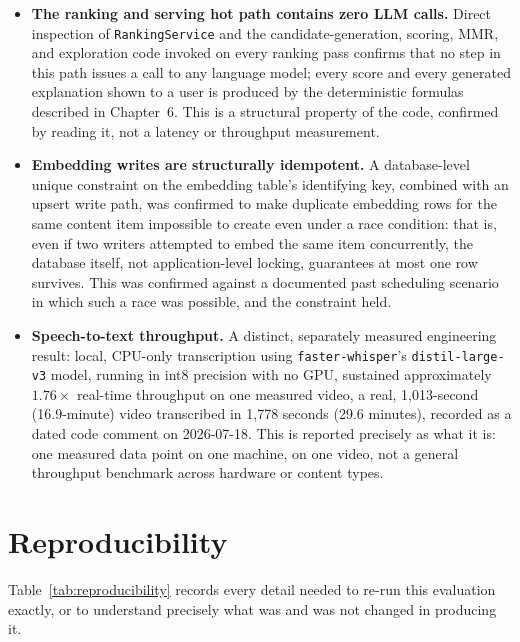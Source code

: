 \begin{itemize}
\item \textbf{The ranking and serving hot path contains zero LLM calls.} Direct inspection of \texttt{RankingService} and the candidate-generation, scoring, MMR, and exploration code invoked on every ranking pass confirms that no step in this path issues a call to any language model; every score and every generated explanation shown to a user is produced by the deterministic formulas described in Chapter~6. This is a structural property of the code, confirmed by reading it, not a latency or throughput measurement.
\item \textbf{Embedding writes are structurally idempotent.} A database-level unique constraint on the embedding table's identifying key, combined with an upsert write path, was confirmed to make duplicate embedding rows for the same content item impossible to create even under a race condition: that is, even if two writers attempted to embed the same item concurrently, the database itself, not application-level locking, guarantees at most one row survives. This was confirmed against a documented past scheduling scenario in which such a race was possible, and the constraint held.
\item \textbf{Speech-to-text throughput.} A distinct, separately measured engineering result: local, CPU-only transcription using \texttt{faster-whisper}'s \texttt{distil-large-v3} model, running in int8 precision with no GPU, sustained approximately $1.76\times$ real-time throughput on one measured video, a real, 1,013-second (16.9-minute) video transcribed in 1,778 seconds (29.6 minutes), recorded as a dated code comment on 2026-07-18. This is reported precisely as what it is: one measured data point on one machine, on one video, not a general throughput benchmark across hardware or content types.
\end{itemize}

\section{Reproducibility}
\label{sec:eval-reproducibility}

Table~\ref{tab:reproducibility} records every detail needed to re-run this evaluation exactly, or to understand precisely what was and was not changed in producing it.


